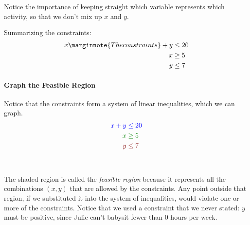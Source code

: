Notice the importance of keeping straight which variable represents which activity, so that we don't mix up $x$ and $y$.

Summarizing the constraints:
\begin{align*}
x\marginnote{The constraints}+y &\leq 20\\
x &\geq 5\\
y &\leq 7
\end{align*}

\paragraph{Graph the Feasible Region} Notice that the constraints form a system of linear inequalities, which we can graph.
\begin{align*}
\color{blue} x+y &\color{blue}\leq 20\\
\color{green!50!black} x &\color{green!50!black}\geq 5\\
\color{red!50!black} y &\color{red!50!black}\leq 7
\end{align*}

\begin{center}
\\
\end{center}
The shaded region is called the \emph{feasible region} because it represents all the combinations $(x,y)$ that are allowed by the constraints.  Any point outside that region, if we substituted it into the system of inequalities, would violate one or more of the constraints.  Notice that we used a constraint that we never stated: $y$ must be positive, since Julie can't babysit fewer than 0 hours per week.

